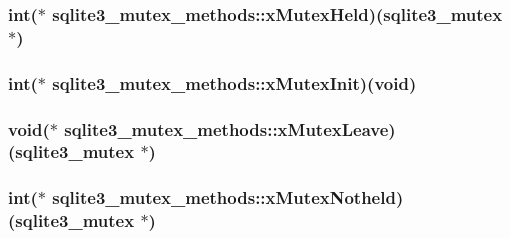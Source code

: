 \hypertarget{structsqlite3__mutex__methods_a5d30a95c614bc08fe156c9ea0f0d88e8}{
\subsubsection[{x\-Mutex\-Held}]{\setlength{\rightskip}{0pt plus 5cm}int($\ast$ sqlite3\-\_\-mutex\-\_\-methods\-::x\-Mutex\-Held)({\bf sqlite3\-\_\-mutex} $\ast$)}}\label{structsqlite3__mutex__methods_a5d30a95c614bc08fe156c9ea0f0d88e8}
\hypertarget{structsqlite3__mutex__methods_af0a78d79b6029444d4a2ac7c474030d4}{
\subsubsection[{x\-Mutex\-Init}]{\setlength{\rightskip}{0pt plus 5cm}int($\ast$ sqlite3\-\_\-mutex\-\_\-methods\-::x\-Mutex\-Init)(void)}}\label{structsqlite3__mutex__methods_af0a78d79b6029444d4a2ac7c474030d4}
\hypertarget{structsqlite3__mutex__methods_acfa193f9130bfc68caf7f1849bcd0dac}{
\subsubsection[{x\-Mutex\-Leave}]{\setlength{\rightskip}{0pt plus 5cm}void($\ast$ sqlite3\-\_\-mutex\-\_\-methods\-::x\-Mutex\-Leave)({\bf sqlite3\-\_\-mutex} $\ast$)}}\label{structsqlite3__mutex__methods_acfa193f9130bfc68caf7f1849bcd0dac}
\hypertarget{structsqlite3__mutex__methods_a7bc1edfd01c67c6dcee26299bc31a7bf}{
\subsubsection[{x\-Mutex\-Notheld}]{\setlength{\rightskip}{0pt plus 5cm}int($\ast$ sqlite3\-\_\-mutex\-\_\-methods\-::x\-Mutex\-Notheld)({\bf sqlite3\-\_\-mutex} $\ast$)}}\label{structsqlite3__mutex__methods_a7bc1edfd01c67c6dcee26299bc31a7bf}
